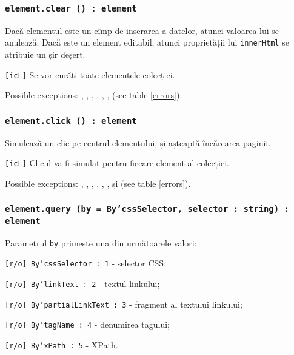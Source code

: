 \subsubsection{\texttt{element.clear () : element}}

Dacă elementul este un cîmp de inserarea a datelor, atunci valoarea lui se anulează. Dacă este un element editabil, atunci proprietății lui \texttt{innerHtml} se atribuie un șir deșert.

\texttt{[icL]} Se vor curăți toate elementele colecției.

Possible exceptions: , , , , , ,  (see table \ref{errors}).

\subsubsection{\texttt{element.click () : element}}

Simulează un clic pe centrul elementului, și așteaptă încărcarea paginii.

\texttt{[icL]} Clicul va fi simulat pentru fiecare element al colecției.

Possible exceptions: , , , , , ,  și  (see table \ref{errors}).

\subsubsection{\texttt{element.query (by = By'cssSelector, selector : string) : element}}

Parametrul \texttt{by} primește una din următoarele valori:
\begin{icItems}
    \item \texttt{[r/o] By'cssSelector : 1} - selector CSS;
	\item \texttt{[r/o] By'linkText : 2} - textul linkului;
	\item \texttt{[r/o] By'partialLinkText : 3} - fragment al textului linkului;
	\item \texttt{[r/o] By'tagName : 4} - denumirea tagului;
	\item \texttt{[r/o] By'xPath : 5} - XPath.
\end{icItems}

